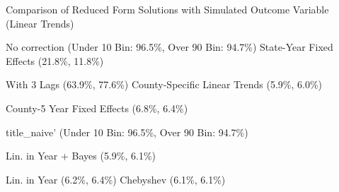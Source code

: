 \caption{Comparison of Reduced Form Solutions with Simulated Outcome Variable (Linear Trends) \label{fig:distributions-existing-solutions}}
\caption*{\color{p1line}{\textbf{\textemdash\textemdash}} No correction (Under 10 Bin: 96.5\%, Over 90 Bin: 94.7\%) \hspace{1cm} \color{p2line}{- - -} State-Year Fixed Effects (21.8\%, 11.8\%)}
\caption*{\color{p3line}{\textbf{- - -}} With 3 Lags (63.9\%, 77.6\%) \hspace{1cm} \color{p4line}{\textbf{- - -}} County-Specific Linear Trends (5.9\%, 6.0\%)}
\caption*{\color{p5line}{\textbf{- - -}} County-5 Year Fixed Effects (6.8\%, 6.4\%)}


\caption*{\color{p1line}{\textbf{\textemdash\textemdash}} title_naive' (Under 10 Bin: 96.5\%, Over 90 Bin: 94.7\%)}
\caption*{\color{p2line}{\textbf{- - -}} Lin. in Year + Bayes (5.9\%, 6.1\%)}
\caption*{\color{p3line}{\textbf{- - -}} Lin. in Year (6.2\%, 6.4\%) \hspace{1cm} \color{p4line}{\textbf{- - -}} Chebyshev (6.1\%, 6.1\%)}